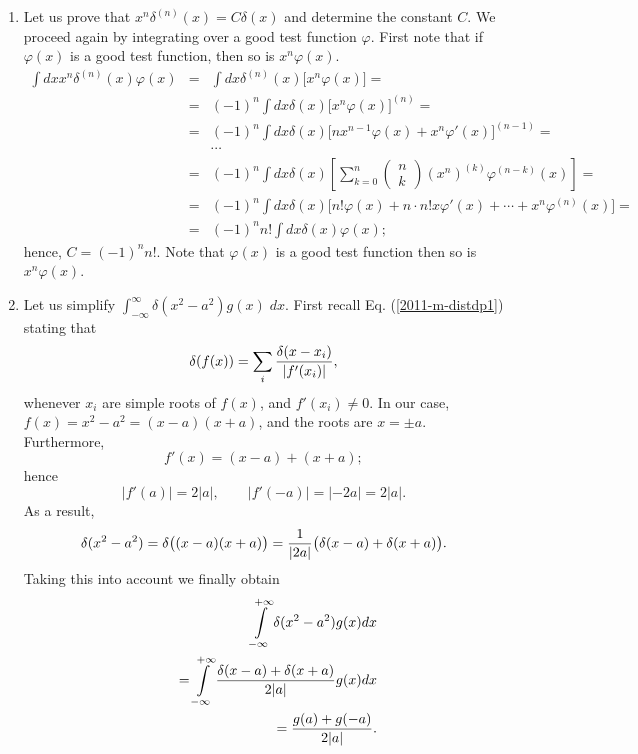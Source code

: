 {\begin{enumerate}
\item
Let us prove that
$x^n\delta^{(n)}(x)=C\delta (x)$    and determine the constant $C$.
We proceed again by integrating over a good test function $\varphi$.
First note that if
$\varphi (x)$ is a good test function, then so is
$x^n\varphi (x)$.
\begin{eqnarray*}
   \int dx x^n\delta^{(n)}(x)\varphi(x)&=&
   \int dx \delta^{(n)}(x)\bigl[x^n\varphi(x)\bigr]=\\
   &=&(-1)^n \int dx \delta(x)\bigl[x^n\varphi(x)\bigr]^{(n)}=\\
   &=&(-1)^n \int dx \delta(x)\bigl[nx^{n-1}\varphi(x)+x^n\varphi'(x)
   \bigr]^{(n-1)}=                                              \\
&&\cdots \\
   &=&(-1)^n \int dx \delta(x)\left[\sum_{k=0}^n
           \left(
          \begin{array}{c}
          n\\ k
           \end{array}\right) (x^n)^{(k)}\varphi ^{(n-k)}(x)\right]
   =\\
   &=&(-1)^n \int dx
\delta(x)\bigl[n!\varphi(x)+n\cdot n!x\varphi'(x) +
\cdots +x^n\varphi^{(n)}(x)
   \bigr]=\\
   &=&(-1)^n n! \int dx \delta(x)\varphi(x);
\end{eqnarray*}
hence, $ C=(-1)^n n!$.
Note that
$\varphi (x)$ is a good test function then so is
$x^n\varphi (x)$.

\item
Let us simplify $\int_{-\infty}^\infty \delta (x^2-a^2)g(x)\; dx$.
First recall Eq. (\ref{2011-m-distdp1})  stating that
$$
   \delta(f(x))=\sum_{i}{\delta(x-x_i)\over|f'(x_i)|},
$$
whenever $x_i$ are simple roots of  $f(x)$, and $f'(x_i)\neq 0$.
In our case, $
   f(x)=x^2-a^2=(x-a)(x+a)
$, and the roots are  $x=\pm a$.
Furthermore,
$$
   f'(x)=(x-a)+(x+a);
$$
hence
$$
   |f'(a)|=2|a|,\qquad |f'(-a)|=|-2a|=2|a|.
$$
As a result,
$$
    \delta(x^2-a^2)=\delta\bigl((x-a)(x+a)\bigr)={1\over|2a|}
   \bigl(\delta(x-a)+\delta(x+a)\bigr).
$$
Taking this into account we finally obtain
 \begin{equation}
\begin{split}
  \int\limits_{-\infty}^{+\infty}\delta(x^2-a^2)
   g(x)dx\\
\qquad =
\int\limits_{-\infty}^{+\infty}{\delta(x-a)+\delta(x+a)\over
   2|a|}g(x)dx\\
\qquad =    {g(a)+g(-a)\over2|a|}.
\end{split}
\end{equation}



\end{enumerate}}
